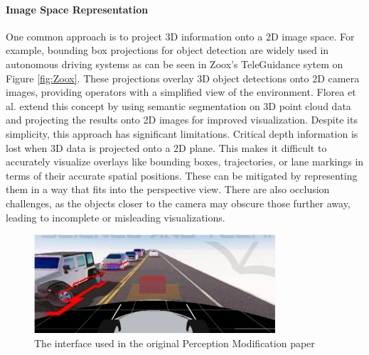 \paragraph{Image Space Representation} One common approach is to project 3D information onto a
2D image space. For example, bounding box projections for object detection are
widely used in autonomous driving systems as can be seen in Zoox's TeleGuidance sytem
on Figure \ref{fig:Zoox}. These projections overlay 3D object
detections onto 2D camera images, providing operators with a simplified view of
the environment. Florea et al. \cite{Florea} extend this concept by using semantic segmentation on
3D point cloud data and projecting the results onto 2D images for improved
visualization. Despite its simplicity, this approach has significant limitations.
Critical depth information is lost when 3D data is projected onto a 2D plane. This makes
it difficult to accurately visualize overlays like bounding boxes, trajectories, or
lane markings in terms of their accurate spatial positions. These can be mitigated by
representing them in a way that fits into the perspective view. There are also occlusion
challenges, as the objects closer to the camera may obscure those further away, leading
to incomplete or misleading visualizations.

\begin{figure}
    \includegraphics[width=0.8\textwidth]{figures/perceptionMod.png}
    \centering
    \caption{The interface used in the original Perception Modification paper \cite{feiler2023perception}}
    \label{fig:PerceptionMod}
\end{figure}
